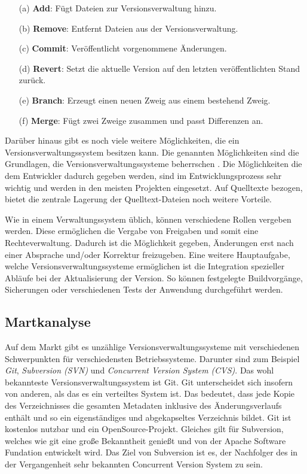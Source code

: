 \begin{itemize}
	\item[(a)] \textbf{Add}: Fügt Dateien zur Versionsverwaltung hinzu.
	\item[(b)] \textbf{Remove}: Entfernt Dateien aus der Versionsverwaltung.
	\item[(c)] \textbf{Commit}: Veröffentlicht vorgenommene Änderungen. 
	\item[(d)] \textbf{Revert}: Setzt die aktuelle Version auf den letzten veröffentlichten Stand zurück. 
	\item[(e)] \textbf{Branch}: Erzeugt einen neuen Zweig aus einem bestehend Zweig. 
	\item[(f)] \textbf{Merge}: Fügt zwei Zweige zusammen und passt Differenzen an. 
\end{itemize}
Darüber hinaus gibt es noch viele weitere Möglichkeiten, die ein Versionsverwaltungssystem besitzen kann. Die genannten Möglichkeiten sind die Grundlagen, die Versionsverwaltungssysteme beherrschen \cite{Davis.2020}. Die Möglichkeiten die dem Entwickler dadurch gegeben werden, sind im Entwicklungsprozess sehr wichtig und werden in den meisten Projekten eingesetzt. Auf Quelltexte bezogen, bietet die zentrale Lagerung der Quelltext-Dateien noch weitere Vorteile. 

Wie in einem Verwaltungssystem üblich, können verschiedene Rollen vergeben werden. Diese ermöglichen die Vergabe von Freigaben und somit eine Rechteverwaltung. Dadurch ist die Möglichkeit gegeben, Änderungen erst nach einer Absprache und/oder Korrektur freizugeben.
Eine weitere Hauptaufgabe, welche Versionsverwaltungssysteme ermöglichen ist die Integration spezieller Abläufe bei der Aktualisierung der Version. So können festgelegte Buildvorgänge, Sicherungen oder verschiedenen Tests der Anwendung durchgeführt werden. 

\subsection{Martkanalyse}
\label{subsubsec:vcanalyze}
Auf dem Markt gibt es unzählige Versionsverwaltungssysteme mit verschiedenen Schwerpunkten für verschiedensten Betriebssysteme. Darunter sind zum Beispiel \textit{Git}, \textit{Subversion (SVN)} und \textit{Concurrent Version System (CVS)}. Das wohl bekannteste Versionsverwaltungssystem ist Git. Git unterscheidet sich insofern von anderen, als das es ein verteiltes System ist. Das bedeutet, dass jede Kopie des Verzeichnisses die gesamten Metadaten inklusive des Änderungsverlaufs enthält und so ein eigenständiges und abgekapseltes Verzeichnis bildet. Git ist kostenlos nutzbar und ein OpenSource-Projekt. Gleiches gilt für Subversion, welches wie git eine große Bekanntheit genießt und von der Apache Software Fundation entwickelt wird. Das Ziel von Subversion ist es, der Nachfolger des in der Vergangenheit sehr bekannten Concurrent Version System zu sein. 

